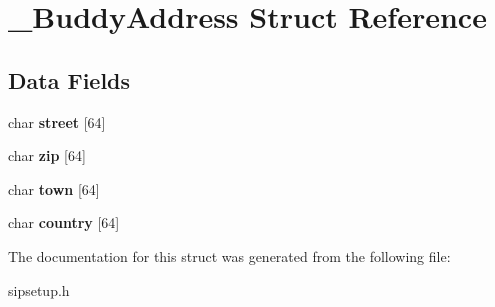 \section{\+\_\+\+Buddy\+Address Struct Reference}
\label{struct__BuddyAddress}
\subsection*{Data Fields}
\begin{DoxyCompactItemize}
\item 
\mbox{\label{struct__BuddyAddress_a55dc37b684f7ed7d458643796a4fa4ed}} 
char {\bfseries street} [64]
\item 
\mbox{\label{struct__BuddyAddress_a775911ad6baa96e303d473e892c1c329}} 
char {\bfseries zip} [64]
\item 
\mbox{\label{struct__BuddyAddress_a11313e2dde60eff28cacd58c2d627a6a}} 
char {\bfseries town} [64]
\item 
\mbox{\label{struct__BuddyAddress_acc66da050a7fdeac3cb68f51527a690f}} 
char {\bfseries country} [64]
\end{DoxyCompactItemize}


The documentation for this struct was generated from the following file\+:\begin{DoxyCompactItemize}
\item 
sipsetup.\+h\end{DoxyCompactItemize}
